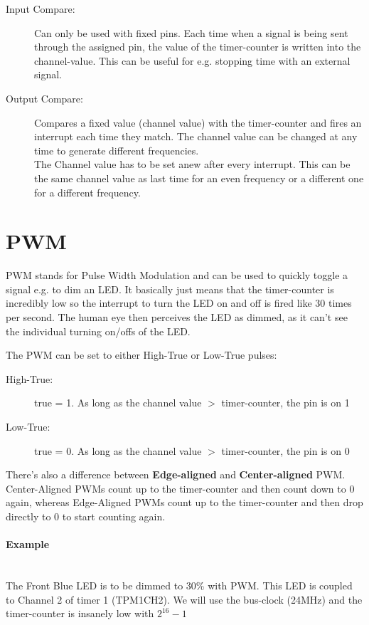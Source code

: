 \documentclass[a4paper, 11pt, nofootinbib]{article}
\begin{document}
\begin{description}
	\item[Input Compare: ] Can only be used with fixed pins. Each time when a signal is being sent through the assigned pin, the value of the timer-counter is written into the channel-value. This can be useful for e.g. stopping time with an external signal.
	\item[Output Compare: ] Compares a fixed value (channel value) with the timer-counter and fires an interrupt each time they match. The channel value can be changed at any time to generate different frequencies. \\
	The Channel value has to be set anew after every interrupt. This can be the same channel value as last time for an even frequency or a different one for a different frequency.
\end{description}

\newpage

\section{PWM}
PWM stands for Pulse Width Modulation and can be used to quickly toggle a signal e.g. to dim an LED. It basically just means that the timer-counter is incredibly low so the interrupt to turn the LED on and off is fired like 30 times per second. The human eye then perceives the LED as dimmed, as it can't see the individual turning on/offs of the LED.

\vspace{10px}

\noindent The PWM can be set to either High-True or Low-True pulses:

\begin{description}
	\item[High-True: ] true = 1. As long as the channel value $>$ timer-counter, the pin is on 1
	\item[Low-True: ] true = 0. As long as the channel value $>$ timer-counter, the pin is on 0
\end{description}

There's also a difference between \textbf{Edge-aligned} and \textbf{Center-aligned} PWM. Center-Aligned PWMs count up to the timer-counter and then count down to 0 again, whereas Edge-Aligned PWMs count up to the timer-counter and then drop directly to 0 to start counting again.

\paragraph{Example}\mbox{}\\
The Front Blue LED is to be dimmed to 30\% with PWM. This LED is coupled to Channel 2 of timer 1 (TPM1CH2). We will use the bus-clock (24MHz) and the timer-counter is insanely low with $2^{16}-1$
\end{document}
